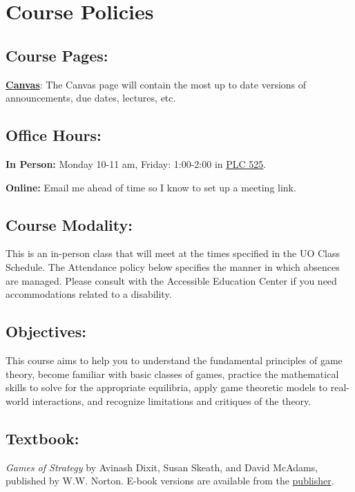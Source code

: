 \section{Course Policies}
\subsection*{Course Pages:}

 \href{https://canvas.uoregon.edu/courses/233504}{\textbf{Canvas}}:
  The Canvas page will contain the most up to date versions of announcements, due dates, lectures, etc. 

\subsection*{Office Hours:} 

  \textbf{In Person:} Monday 10-11 am, Friday: 1:00-2:00
  in \href{https://map.uoregon.edu/4f4d713e0}{PLC 525}.
  
  \textbf{Online:} Email me ahead of time so I know to set up a meeting link.

\subsection*{Course Modality:}

This is an in-person class that will meet at the times specified in the UO Class Schedule.
The Attendance policy below specifies the manner in which absences are managed.
Please consult with the Accessible Education Center if you need accommodations related to a disability.

\subsection*{Objectives:}

This course aims to help you to understand the fundamental principles of game theory, become familiar with basic classes of games, practice the mathematical skills to solve for the appropriate equilibria, apply game theoretic models to real-world interactions, and recognize limitations and critiques of the theory.

\subsection*{Textbook:}

  \textit{Games of Strategy} by Avinash Dixit, Susan Skeath, and David McAdams, published by W.W. Norton.
  E-book versions are available from the \href{https://wwnorton.com/books/Games-of-Strategy}{publisher}.
  

